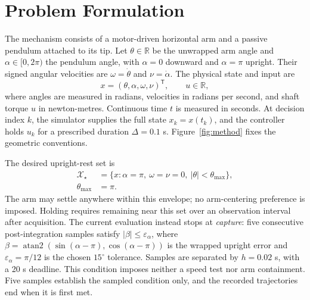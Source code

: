 \documentclass[letterpaper,10pt,conference]{ieeeconf}
\begin{document}
\section{Problem Formulation}
The mechanism consists of a motor-driven horizontal arm and a passive pendulum attached to its tip. Let $\theta\in\mathbb{R}$ be the unwrapped arm angle and $\alpha\in[0,2\pi)$ the pendulum angle, with $\alpha=0$ downward and $\alpha=\pi$ upright. Their signed angular velocities are $\omega=\dot\theta$ and $\nu=\dot\alpha$. The physical state and input are
\begin{equation}
 x=(\theta,\alpha,\omega,\nu)^{\mathsf T},\qquad u\in\mathbb{R},
 \label{eq:state}
\end{equation}
where angles are measured in radians, velocities in radians per second, and shaft torque $u$ in newton-metres. Continuous time $t$ is measured in seconds. At decision index $k$, the simulator supplies the full state $x_k=x(t_k)$, and the controller holds $u_k$ for a prescribed duration $\Delta=0.1$ s. Figure~\ref{fig:method} fixes the geometric conventions.

The desired upright-rest set is
\begin{equation}
\begin{aligned}
 \mathcal{X}_{\star}&=\{x:\alpha=\pi,\ \omega=\nu=0,\ |\theta|<\theta_{\max}\},\\
 \theta_{\max}&=\pi.
\end{aligned}
\label{eq:target}
\end{equation}
The arm may settle anywhere within this envelope; no arm-centering preference is imposed. Holding requires remaining near this set over an observation interval after acquisition. The current evaluation instead stops at \emph{capture}: five consecutive post-integration samples satisfy $|\beta|\leq\varepsilon_\alpha$, where $\beta=\operatorname{atan2}(\sin(\alpha-\pi),\cos(\alpha-\pi))$ is the wrapped upright error and $\varepsilon_\alpha=\pi/12$ is the chosen $15^\circ$ tolerance. Samples are separated by $h=0.02$ s, with a 20 s deadline. This condition imposes neither a speed test nor arm containment. Five samples establish the sampled condition only, and the recorded trajectories end when it is first met.
\end{document}
